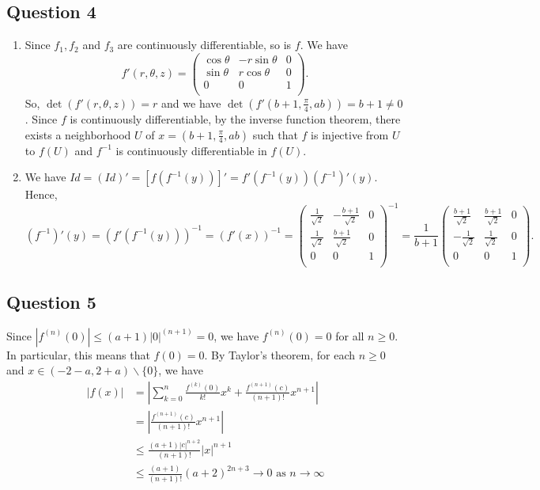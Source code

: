 \documentclass{article}
\begin{document}
\subsection*{Question 4}
\begin{enumerate}[label=\roman*)]
    \item Since $f_1,f_2$ and $f_3$ are continuously differentiable, so is $f$. We have 
    $$
    f'(r,\theta,z) = 
    \begin{pmatrix}
        \cos\theta &-r\sin\theta &0\\
        \sin\theta &r\cos\theta &0\\
        0 &0 &1\\
    \end{pmatrix}.
    $$ So, $\det(f'(r,\theta,z)) = r$ and we have $\det\left(f'\left(b+1,\frac{\pi}{4},ab\right)\right) 
    = b+1 \neq 0$. Since $f$ is continuously differentiable, by the inverse function theorem, there 
    exists a neighborhood $U$ of $x=(b+1,\frac{\pi}{4},ab)$ such that $f$ is injective from $U$ to 
    $f(U)$ and $f^{-1}$ is continuously differentiable in $f(U)$. 
    
    \item We have $Id = (Id)' = [f(f^{-1}(y))]' = f'(f^{-1}(y)) (f^{-1})'(y)$. Hence, 
    $$ (f^{-1})'(y) = (f'(f^{-1}(y)))^{-1} = (f'(x))^{-1} =
    \begin{pmatrix}
        \frac{1}{\sqrt{2}} &-\frac{b+1}{\sqrt{2}} &0\\
        \frac{1}{\sqrt{2}} &\frac{b+1}{\sqrt{2}} &0\\
        0 &0 &1\\    
    \end{pmatrix}^{-1}
    =
    \frac{1}{b+1}\begin{pmatrix}
        \frac{b+1}{\sqrt{2}} &\frac{b+1}{\sqrt{2}} &0\\
        -\frac{1}{\sqrt{2}} &\frac{1}{\sqrt{2}} &0\\
        0 &0 &1\\    
    \end{pmatrix}. $$
\end{enumerate}

\subsection*{Question 5}
Since $|f^{(n)}(0)|\leq (a+1)|0|^{(n+1)}=0$, we have $f^{(n)}(0)=0$ for all $n\geq 0$. 
In particular, this means that $f(0)=0$. 
By Taylor's theorem, for each $n\geq 0$ and $x\in(-2-a,2+a)\backslash\{0\}$, we have 
\begin{align*}
    |f(x)| &= \left| \sum_{k=0}^n \frac{f^{(k)}(0)}{k!}x^k + \frac{f^{(n+1)}(c)}{(n+1)!}x^{n+1} \right| \\&
= \left| \frac{f^{(n+1)}(c)}{(n+1)!}x^{n+1} \right| \\& \leq \frac{(a+1)|c|^{n+2}}{(n+1)!}|x|^{n+1} 
\\& \leq \frac{(a+1)}{(n+1)!} (a+2)^{2n+3}  \to 0 \text{ as } n\to\infty 
\end{align*}
\end{document}

